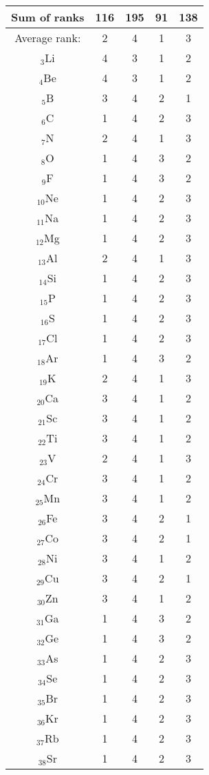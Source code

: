 \begin{longtable}[c]{| c || c |c|c|c|}
 \hline
 \hline
Sum of ranks & 116& 195& 91& 138\\
 \hline
  \hline
 Average rank: & 2& 4& 1& 3\\
 \hline
 \endlastfoot
$_{3}$Li & 4 & 3 & 1 & 2 \\
$_{4}$Be & 4 & 3 & 1 & 2 \\
$_{5}$B & 3 & 4 & 2 & 1 \\
$_{6}$C & 1 & 4 & 2 & 3 \\
$_{7}$N & 2 & 4 & 1 & 3 \\
$_{8}$O & 1 & 4 & 3 & 2 \\
$_{9}$F & 1 & 4 & 3 & 2 \\
$_{10}$Ne & 1 & 4 & 2 & 3 \\
$_{11}$Na & 1 & 4 & 2 & 3 \\
$_{12}$Mg & 1 & 4 & 2 & 3 \\
$_{13}$Al & 2 & 4 & 1 & 3 \\
$_{14}$Si & 1 & 4 & 2 & 3 \\
$_{15}$P & 1 & 4 & 2 & 3 \\
$_{16}$S & 1 & 4 & 2 & 3 \\
$_{17}$Cl & 1 & 4 & 2 & 3 \\
$_{18}$Ar & 1 & 4 & 3 & 2 \\
$_{19}$K & 2 & 4 & 1 & 3 \\
$_{20}$Ca & 3 & 4 & 1 & 2 \\
$_{21}$Sc & 3 & 4 & 1 & 2 \\
$_{22}$Ti & 3 & 4 & 1 & 2 \\
$_{23}$V & 2 & 4 & 1 & 3 \\
$_{24}$Cr & 3 & 4 & 1 & 2 \\
$_{25}$Mn & 3 & 4 & 1 & 2 \\
$_{26}$Fe & 3 & 4 & 2 & 1 \\
$_{27}$Co & 3 & 4 & 2 & 1 \\
$_{28}$Ni & 3 & 4 & 1 & 2 \\
$_{29}$Cu & 3 & 4 & 2 & 1 \\
$_{30}$Zn & 3 & 4 & 1 & 2 \\
$_{31}$Ga & 1 & 4 & 3 & 2 \\
$_{32}$Ge & 1 & 4 & 3 & 2 \\
$_{33}$As & 1 & 4 & 2 & 3 \\
$_{34}$Se & 1 & 4 & 2 & 3 \\
$_{35}$Br & 1 & 4 & 2 & 3 \\
$_{36}$Kr & 1 & 4 & 2 & 3 \\
$_{37}$Rb & 1 & 4 & 2 & 3 \\
$_{38}$Sr & 1 & 4 & 2 & 3 \\

\end{longtable}
